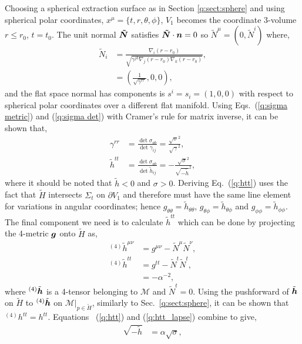 Choosing a spherical extraction surface as in Section \ref{q:sect:sphere} and using spherical polar coordinates, $x^\mu = \{t,r,\theta,\phi\}$, $V_1$ becomes the coordinate 3-volume $r\leq r_0$, $t=t_0$. The unit normal $\boldsymbol{\tilde{N}}$ satisfies $\boldsymbol{\tilde{N}}\cdot \boldsymbol{n} =0$ so $\tilde N^\mu = (0,\tilde N^i)$ where,
\begin{align}
\tilde N_i &= \frac{\nabla_i (r-r_0)}{\sqrt{\gamma^{jk}\nabla_j (r-r_0) \nabla_k (r-r_0)}}, \\
 &= (\frac{1}{\sqrt{\gamma^{rr}}},0,0),
\end{align}
and the flat space normal has components is $s^i = s_i = (1,0,0)$ with respect to spherical polar coordinates over a different flat manifold. Using Eqs.~(\ref{q:sigma metric}) and (\ref{q:sigma det}) with Cramer's rule for matrix inverse, it can be shown that,
\begin{align}
\gamma^{rr} &= \frac{\det \sigma_{ab}}{ \det \gamma_{ij}} = \frac{\sqrt{\sigma}^2}{\sqrt{\gamma}^2}, \\
\label{q:htt}\tilde{h}^{tt} &= \frac{\det \sigma_{ab}}{\det \tilde h_{ij}} = -\frac{\sqrt{\sigma}^2}{\sqrt{-\tilde h}^2},
\end{align}
where it should be noted that $\tilde h < 0$ and $\sigma > 0$. Deriving Eq.~(\ref{q:htt}) uses the fact that $\tilde H$ intersects $\Sigma_t$ on $\partial V_1$ and therefore must have the same line element for variations in angular coordinates; hence $g_{\theta\theta}=\tilde{h}_{\theta\theta}$, $g_{\theta\phi}=\tilde{h}_{\theta\phi}$ and $g_{\phi\phi}=\tilde{h}_{\phi\phi}$. The final component we need is to calculate $\tilde h^{tt}$ which can be done by projecting the 4-metric $\boldsymbol g$ onto $\tilde H$ as,
\begin{align}
{}^{(4)}\tilde{h}^{\mu\nu} &= g^{\mu\nu} - \tilde{N}^\mu \tilde{N}^\nu,\\
{}^{(4)}\tilde{h}^{tt} &= g^{tt} - \tilde{N}^t\tilde{N}^t,\\
         \label{q:htt_lapse}      &= -\alpha^{-2},
\end{align}
where ${}^{(4)}\tilde{\boldsymbol{h}}$ is a 4-tensor belonging to $\mathcal{M}$ and $\tilde{N}^t=0$. Using the pushforward of $\tilde{\boldsymbol h}$ on $\tilde H$ to ${}^{(4)}\tilde{\boldsymbol h}$ on $\mathcal{M}\vert_{p\in{\tilde H}}$, similarly to Sec.~\ref{q:sect:sphere}, it can be shown that ${}^{(4)}h^{tt}=h^{tt}$. Equations ~(\ref{q:htt}) and (\ref{q:htt_lapse}) combine to give,
\begin{align}
  \sqrt{-\tilde{h}} &= \alpha \sqrt{\sigma},
\end{align}
